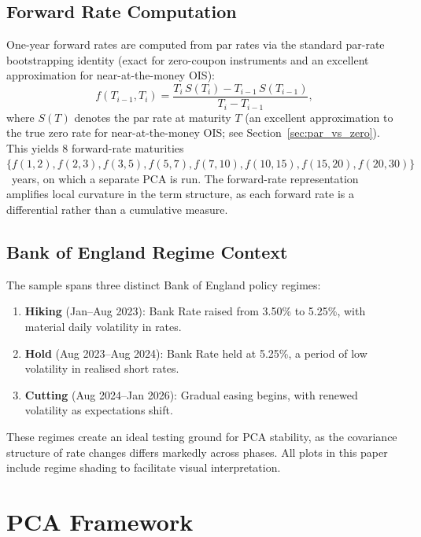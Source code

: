 \documentclass[11pt,a4paper]{article}
\begin{document}
\subsection{Forward Rate Computation}
One-year forward rates are computed from par rates via the
standard par-rate bootstrapping identity (exact for zero-coupon instruments
and an excellent approximation for near-at-the-money OIS):
\begin{equation}
f(T_{i-1},T_i) = \frac{T_i \, S(T_i) - T_{i-1} \, S(T_{i-1})}{T_i - T_{i-1}},
\label{eq:forward}
\end{equation}
where $S(T)$ denotes the par rate at maturity $T$ (an excellent approximation
to the true zero rate for near-at-the-money OIS; see
Section~\ref{sec:par_vs_zero}).  This yields
8 forward-rate maturities \\ $\{f(1,2), f(2,3), f(3,5), f(5,7), f(7,10), f(10,15), f(15,20), f(20,30)\}$~years, on which a
separate PCA is run.  The forward-rate representation amplifies local
curvature in the term structure, as each forward rate is a differential
rather than a cumulative measure.


\subsection{Bank of England Regime Context}
The sample spans three distinct Bank of England policy regimes:
\begin{enumerate}
  \item \textbf{Hiking} (Jan--Aug 2023): Bank Rate raised from 3.50\%
        to 5.25\%, with material daily volatility in rates.
  \item \textbf{Hold} (Aug 2023--Aug 2024): Bank Rate held at 5.25\%,
        a period of low volatility in realised short rates.
  \item \textbf{Cutting} (Aug 2024--Jan 2026): Gradual easing begins,
        with renewed volatility as expectations shift.
\end{enumerate}
These regimes create an ideal testing ground for PCA stability, as the
covariance structure of rate changes differs markedly across phases.
All plots in this paper include regime shading to facilitate visual
interpretation.


\section{PCA Framework}
\label{sec:pca}
\end{document}
